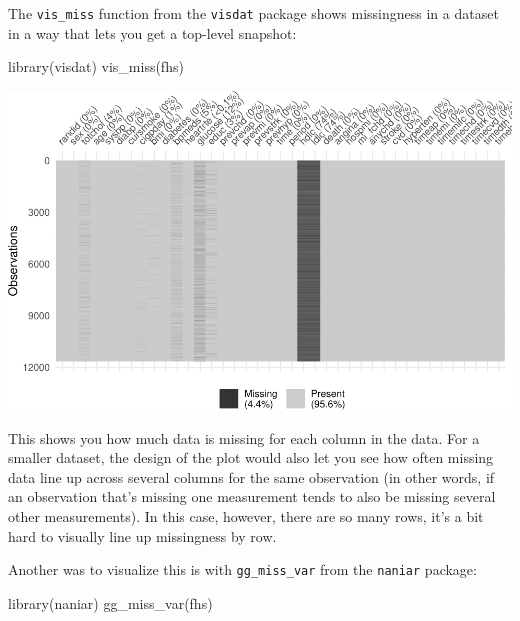 \documentclass[
]{book}
\newenvironment{Shaded}{\begin{snugshade}}{\end{snugshade}}
\newcommand{\FunctionTok}[1]{\textcolor[rgb]{0.00,0.00,0.00}{#1}}
\newcommand{\NormalTok}[1]{#1}
\begin{document}
The \texttt{vis\_miss} function from the \texttt{visdat} package shows missingness in a dataset in a way that lets you
get a top-level snapshot:

\begin{Shaded}
\begin{Highlighting}[]
\FunctionTok{library}\NormalTok{(visdat)}
\FunctionTok{vis\_miss}\NormalTok{(fhs)}
\end{Highlighting}
\end{Shaded}

\includegraphics{adv_epi_analysis_files/figure-latex/unnamed-chunk-173-1.pdf}

This shows you how much data is missing for each column in the data. For a smaller dataset, the design of the plot would also let you see how often missing data line up across several columns for the same observation (in other words, if an observation that's missing one measurement tends to also be missing several other measurements). In this case, however, there are so many rows, it's a bit hard to visually line up missingness by row.

Another was to visualize this is with \texttt{gg\_miss\_var} from the \texttt{naniar} package:

\begin{Shaded}
\begin{Highlighting}[]
\FunctionTok{library}\NormalTok{(naniar)}
\FunctionTok{gg\_miss\_var}\NormalTok{(fhs)}
\end{Highlighting}
\end{Shaded}
\end{document}
